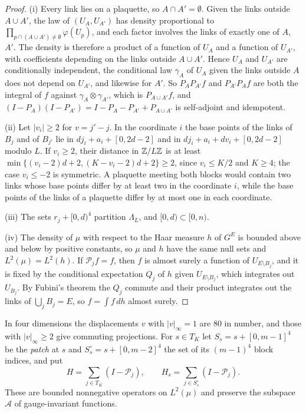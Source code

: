 \begin{proof}
(i) Every link lies on a plaquette, so $A\cap A'=\emptyset$. Given the
links outside $A\cup A'$, the law of $(U_A,U_{A'})$ has density
proportional to $\prod_{p\cap(A\cup A')\ne\emptyset}\varphi(U_p)$, and each
factor involves the links of exactly one of $A$, $A'$. The density is
therefore a product of a function of $U_A$ and a function of $U_{A'}$,
with coefficients depending on the links outside $A\cup A'$. Hence $U_A$
and $U_{A'}$ are conditionally independent, the conditional law
$\gamma_A$ of $U_A$ given the links outside $A$ does not depend on
$U_{A'}$, and likewise for $A'$. So $P_AP_{A'}f$ and $P_{A'}P_Af$ are both
the integral of $f$ against $\gamma_A\otimes\gamma_{A'}$, which is
$P_{A\cup A'}f$, and $(I-P_A)(I-P_{A'})=I-P_A-P_{A'}+P_{A\cup A'}$ is
self-adjoint and idempotent.

(ii) Let $|v_i|\ge2$ for $v=j'-j$. In the coordinate $i$ the base points of
the links of $B_j$ and of $B_{j'}$ lie in $dj_i+a_i+[0,2d-2]$ and in
$dj_i+a_i+dv_i+[0,2d-2]$ modulo $L$. If $v_i\ge2$, their distance in
$\mathbb{Z}/L\mathbb{Z}$ is at least $\min\{(v_i-2)d+2,(K-v_i-2)d+2\}\ge2$, since $v_i\le
K/2$ and $K\ge4$; the case $v_i\le-2$ is symmetric. A plaquette meeting both
blocks would contain two links whose base points differ by at least two in
the coordinate $i$, while the base points of the links of a plaquette
differ by at most one in each coordinate.

(iii) The sets $r_j+[0,d)^4$ partition $\Lambda_L$, and $[0,d)\subset
[0,n)$.

(iv) The density of $\mu$ with respect to the Haar measure $h$ of $G^E$ is
bounded above and below by positive constants, so $\mu$ and $h$ have the
same null sets and $L^2(\mu)=L^2(h)$. If $\mathcal P_jf=f$, then $f$ is
almost surely a function of $U_{E\setminus B_j}$, and it is fixed by the
conditional expectation $Q_j$ of $h$ given $U_{E\setminus B_j}$, which
integrates out $U_{B_j}$. By Fubini's theorem the $Q_j$ commute and their
product integrates out the links of $\bigcup_jB_j=E$, so $f=\int f\,dh$
almost surely.
\end{proof}

In four dimensions the displacements $v$ with $|v|_\infty=1$ are $80$ in
number, and those with $|v|_\infty\ge2$ give commuting projections. For
$s\in T_K$ let $S_s=s+[0,m-1]^4$ be the \emph{patch} at $s$ and $S^\circ_s=
s+[0,m-2]^4$ the set of its $(m-1)^4$ block indices, and put
\[
H=\sum_{j\in T_K}(I-\mathcal P_j),\qquad H_s=\sum_{j\in S^\circ_s}(I-
\mathcal P_j).
\]
These are bounded nonnegative operators on $L^2(\mu)$ and preserve the
subspace $\mathcal A$ of gauge-invariant functions.

